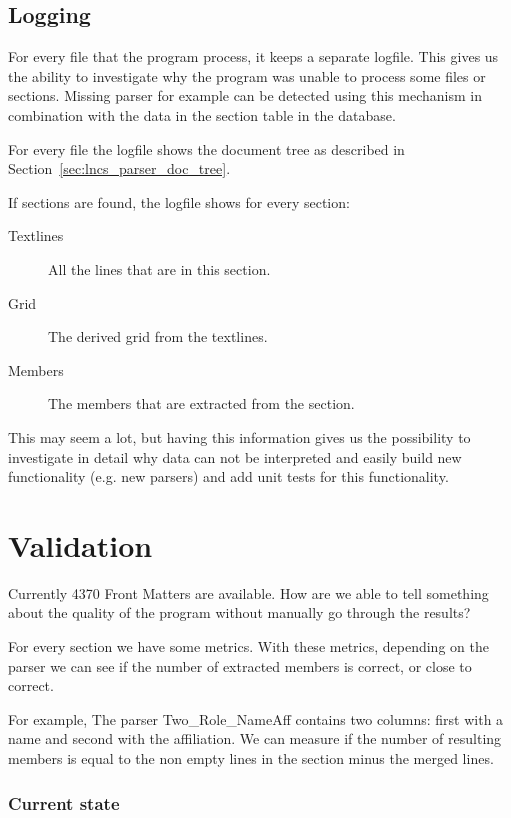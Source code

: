 \documentclass{ou-report}
\begin{document}
\subsection{Logging}
For every file that the program process, it keeps a separate logfile. This gives
us the ability to investigate why the program was unable to process some files 
or sections. Missing parser for example can be detected using this mechanism in
combination with the data in the section table in the database.

For every file the logfile shows the document tree as described in 
Section~\ref{sec:lncs_parser_doc_tree}. 

If sections are found, the logfile shows for every section:
\begin{description}
    \item[Textlines] All the lines that are in this section.
    \item[Grid] The derived grid from the textlines.
    \item[Members] The members that are extracted from the section.
\end{description}
This may seem a lot, but having this information gives us the possibility to 
investigate in detail why data can not be interpreted and easily build new 
functionality (e.g. new parsers) and add unit tests for this functionality.

\section{Validation}
Currently 4370 Front Matters are available. How are we able to tell something 
about the quality of the program without manually go through the results?

For every section we have some metrics. With these metrics, depending on the
parser we can see if the number of extracted members is correct, or close to
correct.

For example, The parser Two\_Role\_NameAff contains two columns: first with a name
and second with the affiliation. We can measure if the number of resulting 
members is equal to the non empty lines in the section minus the merged lines.



\subsubsection{Current state}
\end{document}
